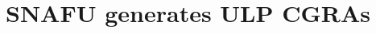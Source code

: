 \chapter{SNAFU generates ULP CGRAs}
\label{chapter:snafu}

\newcommand{\snafuframe}{\snafu}
\newcommand{\snafuarch}{{\protect\fauxsc{Snafu-Arch}}\xspace}
\newcommand*\circled[1]{\tikz[baseline=(char.base)]{\node[shape=circle,draw,inner sep=0.5pt] (char) {#1};}}
\newcommand{\bigemph}[1]{\emph{\bfseries #1}}
\newcommand{\ucore}{\textmu core\xspace}
\newcommand{\ucfg}{\textmu cfg\xspace}












